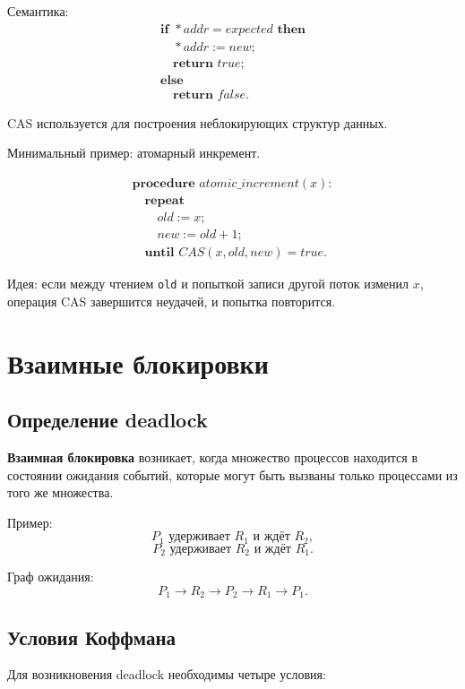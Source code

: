 \documentclass[12pt,a4paper]{article}
\begin{document}
Семантика:
\[
\begin{array}{l}
\textbf{if } *addr = expected \textbf{ then}\\
\quad *addr := new;\\
\quad \textbf{return } true;\\
\textbf{else}\\
\quad \textbf{return } false.
\end{array}
\]

CAS используется для построения неблокирующих структур данных.

Минимальный пример: атомарный инкремент.

\[
\begin{array}{l}
\textbf{procedure } atomic\_increment(x):\\
\quad \textbf{repeat}\\
\quad\quad old := x;\\
\quad\quad new := old + 1;\\
\quad \textbf{until } CAS(x, old, new) = true.
\end{array}
\]

Идея: если между чтением \texttt{old} и попыткой записи другой поток изменил $x$, операция CAS завершится неудачей, и попытка повторится.

\section{Взаимные блокировки}

\subsection{Определение deadlock}

\textbf{Взаимная блокировка} возникает, когда множество процессов находится в состоянии ожидания событий, которые могут быть вызваны только процессами из того же множества.

Пример:
\[
P_1 \text{ удерживает } R_1 \text{ и ждёт } R_2,
\]
\[
P_2 \text{ удерживает } R_2 \text{ и ждёт } R_1.
\]

Граф ожидания:
\[
P_1 \rightarrow R_2 \rightarrow P_2 \rightarrow R_1 \rightarrow P_1.
\]

\subsection{Условия Коффмана}

Для возникновения deadlock необходимы четыре условия:
\end{document}
